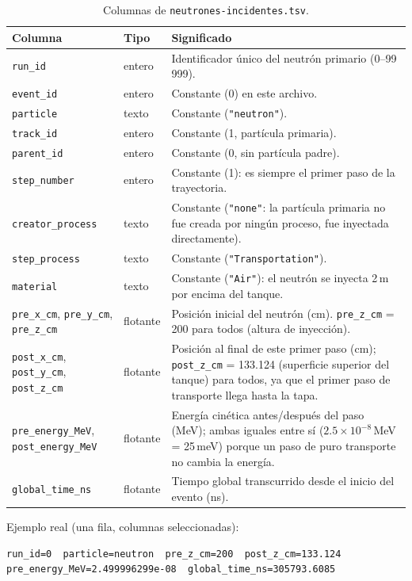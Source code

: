 \documentclass[11pt,a4paper]{article}
\newcommand{\archivo}[1]{\texttt{#1}} %
\newcommand{\var}[1]{\texttt{#1}}
\begin{document}
\begin{table}[H]
\centering
\small
\begin{tabularx}{\linewidth}{l l X}
\toprule
\textbf{Columna} & \textbf{Tipo} & \textbf{Significado} \\
\midrule
\var{run\_id} & entero & Identificador único del neutrón primario (0--99\,999). \\
\var{event\_id} & entero & Constante (0) en este archivo. \\
\var{particle} & texto & Constante (\var{"neutron"}). \\
\var{track\_id} & entero & Constante (1, partícula primaria). \\
\var{parent\_id} & entero & Constante (0, sin partícula padre). \\
\var{step\_number} & entero & Constante (1): es siempre el primer paso de la trayectoria. \\
\var{creator\_process} & texto & Constante (\var{"none"}: la partícula primaria no fue creada por
ningún proceso, fue inyectada directamente). \\
\var{step\_process} & texto & Constante (\var{"Transportation"}). \\
\var{material} & texto & Constante (\var{"Air"}): el neutrón se inyecta 2\,m por encima del tanque. \\
\var{pre\_x\_cm}, \var{pre\_y\_cm}, \var{pre\_z\_cm} & flotante & Posición inicial del neutrón (cm).
\var{pre\_z\_cm} = 200 para todos (altura de inyección). \\
\var{post\_x\_cm}, \var{post\_y\_cm}, \var{post\_z\_cm} & flotante & Posición al final de este
primer paso (cm); \var{post\_z\_cm} = 133.124 (superficie superior del tanque) para todos, ya que
el primer paso de transporte llega hasta la tapa. \\
\var{pre\_energy\_MeV}, \var{post\_energy\_MeV} & flotante & Energía cinética antes/después del
paso (MeV); ambas iguales entre sí ($2.5\times10^{-8}$\,MeV = 25\,meV) porque un paso de puro
transporte no cambia la energía. \\
\var{global\_time\_ns} & flotante & Tiempo global transcurrido desde el inicio del evento (ns). \\
\bottomrule
\end{tabularx}
\caption{Columnas de \archivo{neutrones-incidentes.tsv}.}
\end{table}

\noindent Ejemplo real (una fila, columnas seleccionadas):
\begin{lstlisting}
run_id=0  particle=neutron  pre_z_cm=200  post_z_cm=133.124  pre_energy_MeV=2.499996299e-08  global_time_ns=305793.6085
\end{lstlisting}
\end{document}

